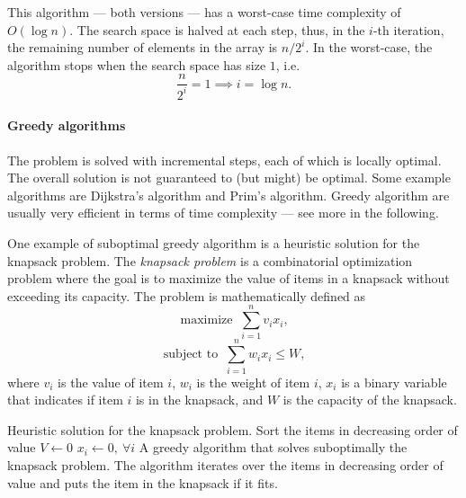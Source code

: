 
This algorithm --- both versions --- has a worst-case time complexity of $O(\log n)$. The
search space is halved at each step, thus, in the $i$-th iteration, the remaining number
of elements in the array is $n / 2^i$.  In the worst-case, the algorithm stops when the
search space has size $1$, i.e.
\[
  \frac{n}{2^i} = 1 \implies i = \log n\text{.}
\]

\paragraph{Greedy algorithms}  The problem is solved with incremental steps, each of which
is locally optimal.  The overall solution is not guaranteed to (but might) be optimal.  Some example
algorithms are Dijkstra's algorithm and Prim's algorithm.  Greedy algorithm are usually
very efficient in terms of time complexity --- see more in the following.

One example of suboptimal greedy algorithm is a heuristic solution for the knapsack problem.
The \emph{knapsack problem} is a combinatorial optimization problem where the goal is to
maximize the value of items in a knapsack without exceeding its capacity.  The problem is
mathematically defined as
\[
  \text{maximize }~\sum_{i = 1}^n v_i x_i\text{,}
\]
\[
  \text{subject to }~\sum_{i = 1}^n w_i x_i \leq W\text{,}
\]
where $v_i$ is the value of item $i$, $w_i$ is the weight of item $i$, $x_i$ is a binary
variable that indicates if item $i$ is in the knapsack, and $W$ is the capacity of the
knapsack.

\begin{algobox}[label=alg:knapsack]{Heuristic solution for the knapsack problem.}
  Sort the items in decreasing order of value\;
  $V \gets 0$\;
  $x_i \gets 0,~\forall i$\;
  \tcblower
  A greedy algorithm that solves suboptimally the knapsack problem.  The algorithm iterates over
  the items in decreasing order of value and puts the item in the knapsack if it fits.
\end{algobox}

